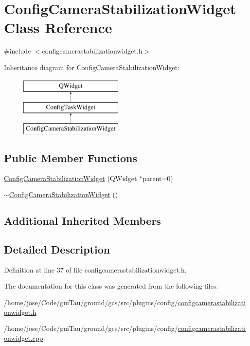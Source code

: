 \hypertarget{class_config_camera_stabilization_widget}{\section{Config\-Camera\-Stabilization\-Widget Class Reference}
\label{class_config_camera_stabilization_widget}
}


{\ttfamily \#include $<$configcamerastabilizationwidget.\-h$>$}

Inheritance diagram for Config\-Camera\-Stabilization\-Widget\-:\begin{figure}[H]
\begin{center}
\leavevmode
\includegraphics[height=3.000000cm]{class_config_camera_stabilization_widget}
\end{center}
\end{figure}
\subsection*{Public Member Functions}
\begin{DoxyCompactItemize}
\item 
\hyperlink{group___config_plugin_gaadc56cb83f84d7f34491592b248a111a}{Config\-Camera\-Stabilization\-Widget} (Q\-Widget $\ast$parent=0)
\item 
\hyperlink{group___config_plugin_ga6294d4eae582574215951c5213ae4e0b}{$\sim$\-Config\-Camera\-Stabilization\-Widget} ()
\end{DoxyCompactItemize}
\subsection*{Additional Inherited Members}


\subsection{Detailed Description}


Definition at line 37 of file configcamerastabilizationwidget.\-h.



The documentation for this class was generated from the following files\-:\begin{DoxyCompactItemize}
\item 
/home/jose/\-Code/gui\-Tau/ground/gcs/src/plugins/config/\hyperlink{configcamerastabilizationwidget_8h}{configcamerastabilizationwidget.\-h}\item 
/home/jose/\-Code/gui\-Tau/ground/gcs/src/plugins/config/\hyperlink{configcamerastabilizationwidget_8cpp}{configcamerastabilizationwidget.\-cpp}\end{DoxyCompactItemize}
